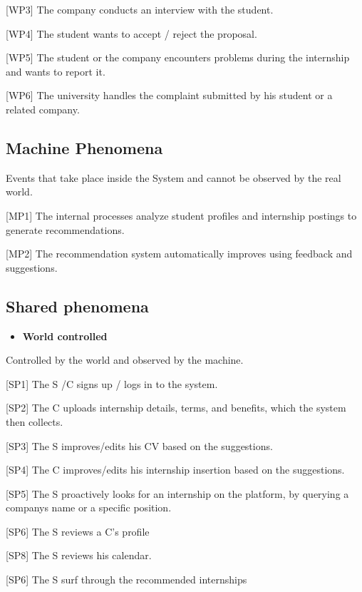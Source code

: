 {[}WP3{]} The company conducts an interview with the student.

{[}WP4{]} The student wants to accept / reject the proposal.

{[}WP5{]} The student or the company encounters problems during the
internship and wants to report it.~

{[}WP6{]} The university handles the complaint submitted by his student
or a related company.

\subsection{Machine Phenomena}
\label{subsec:machine_phenomena}%

Events that take place inside the System and cannot be observed by the
real world.

{[}MP1{]} The internal processes analyze student profiles and internship
postings to generate recommendations.~

{[}MP2{]} The recommendation system automatically improves using
feedback and suggestions.

\subsection{Shared phenomena}
\label{subsec:shared_phenomena}%

\begin{itemize}
\item
  \textbf{World controlled}
\end{itemize}

Controlled by the world and observed by the machine.

{[}SP1{]} The S /C signs up / logs in to the system.

{[}SP2{]} The C uploads internship details, terms, and benefits, which
the system then collects.

{[}SP3{]} The S improves/edits his CV based on the suggestions.

{[}SP4{]} The C improves/edits his internship insertion based on the
suggestions.

{[}SP5{]} The S proactively looks for an internship on the platform, by
querying a company\textquotesingle s name or a specific position.

{[}SP6{]} The S reviews a C's profile

{[}SP8{]} The S reviews his calendar.

{[}SP6{]} The S surf through the recommended internships~

